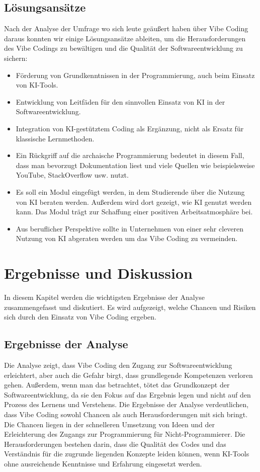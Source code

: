 \documentclass[paper=a4,fontsize=12pt,ngerman]{scrartcl}
\begin{document}
\subsection{Lösungsansätze}
Nach der Analyse der Umfrage wo sich leute geäußert haben über Vibe Coding daraus konnten wir einige Lösungsansätze ableiten, um die Herausforderungen des Vibe Codings zu bewältigen und die Qualität der Softwareentwicklung zu sichern:
\begin{itemize}
    \item Förderung von Grundkenntnissen in der Programmierung, auch beim Einsatz von KI-Tools.
    \item Entwicklung von Leitfäden für den sinnvollen Einsatz von KI in der Softwareentwicklung.
    \item Integration von KI-gestütztem Coding als Ergänzung, nicht als Ersatz für klassische Lernmethoden.
    \item Ein Rückgriff auf die archaische Programmierung bedeutet in diesem Fall, dass man bevorzugt Dokumentation liest und viele Quellen wie beispielsweise YouTube, StackOverflow usw. nutzt.
    \item Es soll ein Modul eingefügt werden, in dem Studierende über die Nutzung von KI beraten werden. Außerdem wird dort gezeigt, wie KI genutzt werden kann. Das Modul trägt zur Schaffung einer positiven Arbeitsatmosphäre bei.
    \item Aus beruflicher Perspektive sollte in Unternehmen von einer sehr cleveren Nutzung von KI abgeraten werden um das Vibe Coding zu vermeinden.  
\end{itemize}

\clearpage
\section{Ergebnisse und Diskussion}
In diesem Kapitel werden die wichtigsten Ergebnisse der Analyse zusammengefasst und diskutiert. Es wird aufgezeigt, welche Chancen und Risiken sich durch den Einsatz von Vibe Coding ergeben.

\subsection{Ergebnisse der Analyse}
Die Analyse zeigt, dass Vibe Coding den Zugang zur Softwareentwicklung erleichtert, aber auch die Gefahr birgt, dass grundlegende Kompetenzen verloren gehen.
Außerdem, wenn man das betrachtet, tötet das Grundkonzept der Softwareentwicklung, da sie den Fokus auf das Ergebnis legen und nicht auf den Prozess des Lernens und Verstehens.
Die Ergebnisse der Analyse verdeutlichen, dass Vibe Coding sowohl Chancen als auch Herausforderungen mit sich bringt.
Die Chancen liegen in der schnelleren Umsetzung von Ideen und der Erleichterung des Zugangs zur Programmierung für Nicht-Programmierer.
Die Herausforderungen bestehen darin, dass die Qualität des Codes und das Verständnis für die zugrunde liegenden Konzepte leiden können, wenn KI-Tools ohne ausreichende Kenntnisse und Erfahrung eingesetzt werden.
\end{document}

